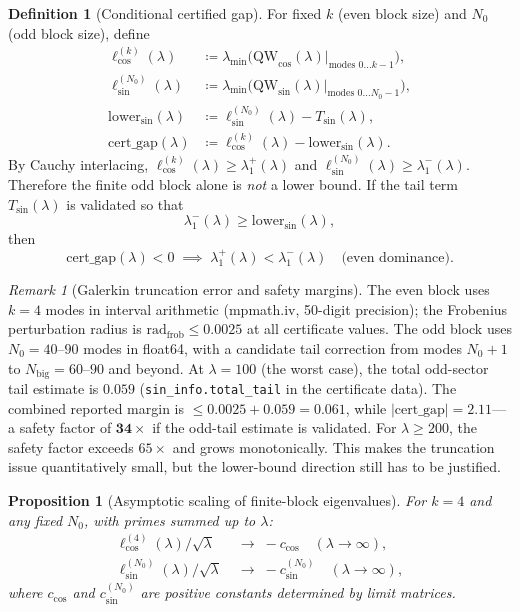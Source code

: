 \documentclass[12pt,a4paper]{article}
\newtheorem{proposition}[theorem]{Proposition}
\theoremstyle{definition}
\newtheorem{definition}[theorem]{Definition}
\theoremstyle{remark}
\newtheorem{remark}[theorem]{Remark}
\begin{document}
\begin{definition}[Conditional certified gap]
For fixed $k$ (even block size) and $N_0$ (odd block size), define
\begin{align*}
  \ell_{\cos}^{(k)}(\lambda) &\coloneqq \lambda_{\min}\!\bigl(\mathrm{QW}_{\cos}(\lambda)\big|_{\text{modes }0\ldots k-1}\bigr), \\
  \ell_{\sin}^{(N_0)}(\lambda) &\coloneqq \lambda_{\min}\!\bigl(\mathrm{QW}_{\sin}(\lambda)\big|_{\text{modes }0\ldots N_0-1}\bigr), \\
  \mathrm{lower}_{\sin}(\lambda) &\coloneqq \ell_{\sin}^{(N_0)}(\lambda)-T_{\sin}(\lambda), \\
  \mathrm{cert\_gap}(\lambda) &\coloneqq \ell_{\cos}^{(k)}(\lambda) - \mathrm{lower}_{\sin}(\lambda).
\end{align*}
By Cauchy interlacing, $\ell_{\cos}^{(k)}(\lambda) \geq \lambda_1^+(\lambda)$ and $\ell_{\sin}^{(N_0)}(\lambda) \geq \lambda_1^-(\lambda)$. Therefore the finite odd block alone is \emph{not} a lower bound. If the tail term $T_{\sin}(\lambda)$ is validated so that
\[
  \lambda_1^-(\lambda) \geq \mathrm{lower}_{\sin}(\lambda),
\]
then
\[
  \mathrm{cert\_gap}(\lambda) < 0 \;\implies\; \lambda_1^+(\lambda) < \lambda_1^-(\lambda) \quad\text{(even dominance).}
\]
\end{definition}

\begin{remark}[Galerkin truncation error and safety margins]
\label{rem:galerkin-safety}
The even block uses $k = 4$ modes in interval arithmetic (mpmath.iv, 50-digit precision); the Frobenius perturbation radius is $\mathrm{rad}_{\mathrm{frob}} \leq 0.0025$ at all certificate values. The odd block uses $N_0 = 40$--$90$ modes in float64, with a candidate tail correction from modes $N_0+1$ to $N_{\mathrm{big}} = 60$--$90$ and beyond. At $\lambda = 100$ (the worst case), the total odd-sector tail estimate is $0.059$ (\texttt{sin\_info.total\_tail} in the certificate data). The combined reported margin is $\leq 0.0025 + 0.059 = 0.061$, while $|\mathrm{cert\_gap}| = 2.11$---a safety factor of $\mathbf{34\times}$ if the odd-tail estimate is validated. For $\lambda \geq 200$, the safety factor exceeds $65\times$ and grows monotonically. This makes the truncation issue quantitatively small, but the lower-bound direction still has to be justified.
\end{remark}

\begin{proposition}[Asymptotic scaling of finite-block eigenvalues]
\label{prop:scaling}
For $k = 4$ and any fixed $N_0$, with primes summed up to $\lambda$:
\begin{align}
  \ell_{\cos}^{(4)}(\lambda) / \sqrt{\lambda} &\;\to\; -c_{\cos} \quad (\lambda \to \infty), \label{eq:ccos-limit} \\
  \ell_{\sin}^{(N_0)}(\lambda) / \sqrt{\lambda} &\;\to\; -c_{\sin}^{(N_0)} \quad (\lambda \to \infty), \label{eq:csin-limit}
\end{align}
where $c_{\cos}$ and $c_{\sin}^{(N_0)}$ are positive constants determined by limit matrices.
\end{proposition}
\end{document}
